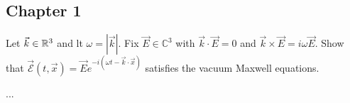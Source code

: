 \subsection{Chapter 1}
\begin{p}
{Let $\vec{k}\in\mathbb{R}^3$ and lt $\omega=|\vec{k}|$. Fix $\vec{E}\in\mathbb{C}^3$ with 
$\vec{k}\cdot\vec{E}=0$ and $\vec{k}\times\vec{E}=i\omega\vec{E}$. Show that 
$\vec{\mathcal{E}}(t,\vec{x})=\vec{E}e^{-i(\omega t-\vec{k}\cdot\vec{x})}$ satisfies the
vacuum Maxwell equations.}
\end{p}
{...}
